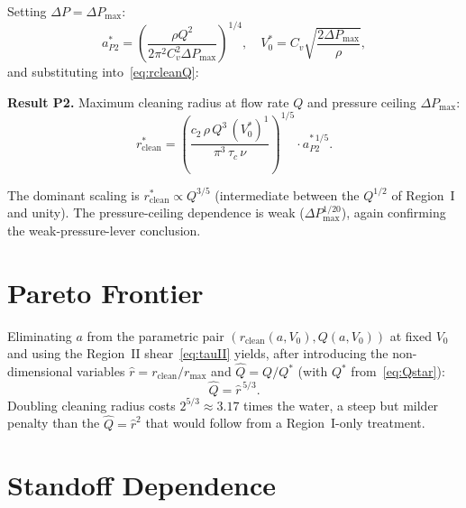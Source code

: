 \documentclass[10pt,letterpaper]{article}
\begin{document}
Setting $\Delta P = \Delta P_\mathrm{max}$:
\begin{equation}
  a^*_{P2} = \left(\frac{\rho Q^2}{2\pi^2 C_v^2 \Delta P_\mathrm{max}}\right)^{1/4},
  \quad V_0^* = C_v\sqrt{\frac{2\Delta P_\mathrm{max}}{\rho}},
  \label{eq:aP2}
\end{equation}
and substituting into~\eqref{eq:rcleanQ}:
\begin{mdframed}[style=resultbox]
\textbf{Result P2.} Maximum cleaning radius at flow rate $Q$ and
pressure ceiling $\Delta P_\mathrm{max}$:
\begin{equation}
  r^*_\mathrm{clean}
  = \left(\frac{c_2\,\rho\,Q^3\,(V_0^*)^{1}}{\pi^3\,\tau_c\,\nu}\right)^{1/5}
  \cdot a^{*\,1/5}_{P2}.
  \label{eq:rstar}
\end{equation}
\end{mdframed}
The dominant scaling is $r^*_\mathrm{clean} \propto Q^{3/5}$ (intermediate
between the $Q^{1/2}$ of Region~I and unity). The pressure-ceiling
dependence is weak ($\Delta P_\mathrm{max}^{1/20}$), again confirming
the weak-pressure-lever conclusion.

\section{Pareto Frontier}
\label{sec:pareto}

Eliminating $a$ from the parametric pair
$(r_\mathrm{clean}(a, V_0), Q(a, V_0))$ at fixed $V_0$ and using the
Region~II shear~\eqref{eq:tauII} yields, after introducing the
non-dimensional variables $\hat r = r_\mathrm{clean}/r_\mathrm{max}$ and
$\hat Q = Q/Q^*$ (with $Q^*$ from~\eqref{eq:Qstar}):
\begin{equation}
  \hat Q = \hat r^{\,5/3}.
  \label{eq:pareto}
\end{equation}
Doubling cleaning radius costs $2^{5/3} \approx 3.17$ times the water,
a steep but milder penalty than the $\hat Q = \hat r^2$ that would follow
from a Region~I-only treatment.

\section{Standoff Dependence}
\label{sec:standoff}
\end{document}
